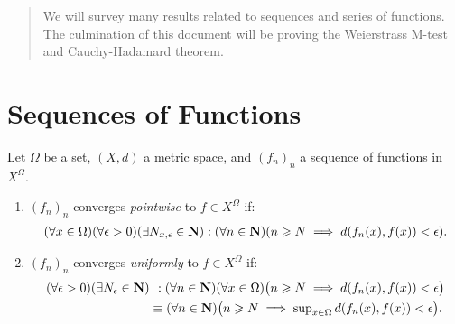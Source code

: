 \documentclass[11pt,twoside,openany]{memoir}
\begin{document}

\begin{abstract}
    We will survey many results related to sequences and series of functions. The culmination of this document will be proving the Weierstrass M-test and Cauchy-Hadamard theorem. 
\end{abstract}

\section*{Sequences of Functions}
    \begin{definition}
        Let $\Omega$ be a set, $(X,d)$ a metric space, and $(f_n)_n$ a sequence of functions in $X^\Omega$.
        \begin{enumerate}[label = (\arabic*),itemsep=-7pt,topsep=3pt]
            \item $(f_n)_n$ converges \textit{pointwise} to $f \in X^\Omega$ if:
                \begin{equation*}
                \begin{split}
                    (\forall x \in \Omega)(\forall \epsilon > 0)(\exists N_{x,\epsilon} \in \bfN) : (\forall n \in \bfN)( n \geq N \implies d(f_n(x), f(x)) < \epsilon).
                \end{split}
                \end{equation*}
            \item $(f_n)_n$ converges \textit{uniformly} to $f \in X^\Omega$ if:
                \begin{equation*}
                \begin{split}
                        (\forall \epsilon > 0)(\exists N_\epsilon \in \bfN) &\h4: (\forall n \in \bfN)(\forall x \in \Omega)\bigl(n \geq N \implies d(f_n(x), f(x)) < \epsilon\bigr) \\
                        &\equiv (\forall n \in \bfN)\bigl(n \geq N \implies {\ts \sup_{x \in \Omega}d(f_n(x),f(x))} < \epsilon\bigr).
                \end{split}
                \end{equation*}
        \end{enumerate}
    \end{definition}
\end{document}
